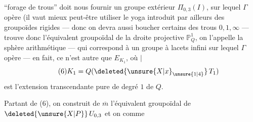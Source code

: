 ``forage de trous'' doit nous fournir un groupe extérieur $\Pi_{0,3}(I)$,  sur lequel $\Gamma$ opère (il vaut mieux peut-être utiliser le yoga introduit par ailleurs des groupoïdes rigides — donc on   devra aussi boucher certains des trous $0,1,\infty$ —  trouve donc l'équivalent groupoïdal de la  droite projective $\mathbb P^1_Q$, on l'appelle la sphère arithmétique — qui correspond à un groupe  à lacets infini sur lequel $\Gamma$ opère — en fait, ce n'est autre que $E_{K_1}$, où $\vert$
\[
\tag{6}K_1=Q(\deleted{\unsure{X|x}_{\unsure{1|4}}}\,T_1)
\]
est l'extension transcendante pure  de degré $1$ de $Q$.

Partant de (6), on construit de $\overline m$ l'équivalent groupoïdal de $\deleted{\unsure{X|P}}\,U_{0,3}$  et on  comme
